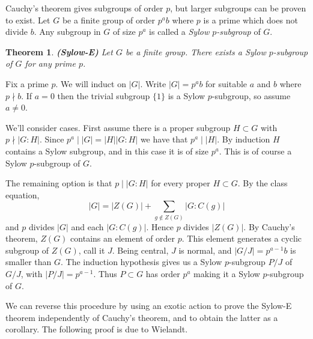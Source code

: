 \documentclass[letterpaper]{article}
\newtheorem{theorem}{Theorem}[section]
\newenvironment{proof}[1][Proof]{\begin{trivlist}
\item[\hskip \labelsep {\bfseries #1}]}{\end{trivlist}}
\begin{document}
Cauchy's theorem gives subgroups of order $p$, but larger subgroups
can be proven to exist. Let $G$ be a finite group of order $p^ab$
where $p$ is a prime which does not divide $b$. Any subgroup in $G$
of size $p^a$ is called a \emph{Sylow $p$-subgroup} of $G$.

\begin{theorem}
\emph{\textbf{(Sylow-E)}}
Let $G$ be a finite group. There exists a Sylow $p$-subgroup of $G$
for any prime $p$.
\end{theorem}
\begin{proof}
Fix a prime $p$. We will induct on $|G|$. Write $|G| = p^ab$ for
suitable $a$ and $b$ where $p \nmid b$. If $a = 0$ then the trivial
subgroup $\{1\}$ is a Sylow $p$-subgroup, so assume $a \neq 0$.

We'll consider cases. First assume there is a proper subgroup $H
\subset G$ with $p \nmid |G : H|$. Since $p^a \mid |G| = |H||G :
H|$ we have that $p^a \mid |H|$. By induction $H$ contains a Sylow
subgroup, and in this case it is of size $p^a$. This is of course
a Sylow $p$-subgroup of $G$.

The remaining option is that $p \mid |G : H|$ for every proper $H
\subset G$. By the class equation,
\[|G| = |Z(G)| + \sum_{g \not \in Z(G)} |G \colon C(g)|\]
and $p$ divides $|G|$ and each $|G \colon C(g)|$. Hence $p$ divides
$|Z(G)|$. By Cauchy's theorem, $Z(G)$ contains an element of order
$p$. This element generates a cyclic subgroup of $Z(G)$, call it
$J$. Being central, $J$ is normal, and $|G/J| = p^{a-1}b$ is smaller
than $G$. The induction hypothesis gives us a Sylow $p$-subgroup
$P/J$ of $G/J$, with $|P/J| = p^{a-1}$. Thus $P \subset G$ has order
$p^a$ making it a Sylow $p$-subgroup of $G$.
\end{proof}

We can reverse this procedure by using an exotic action to prove
the Sylow-E theorem independently of Cauchy's theorem, and to obtain
the latter as a corollary. The following proof is due to Wielandt.
\end{document}
